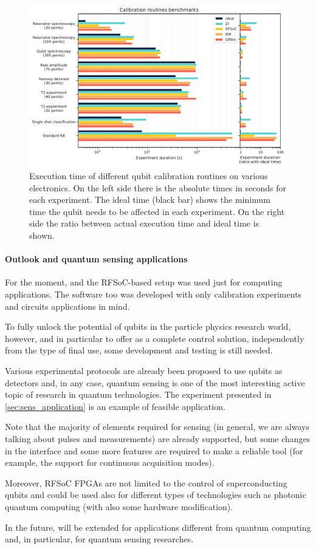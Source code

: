 \begin{figure}[ht]
    \centering
    \includegraphics[width=\textwidth]{Other sections/figures/routines.pdf}
    \caption[Speed benchmark of a \Qibosoq system Vs. commercial alternatives]{Execution time of different qubit calibration routines on various electronics. On the left side there is the absolute times in seconds for each experiment. The ideal time (black bar) shows the minimum time the qubit needs to be affected in each experiment. On the right side the ratio between actual execution time and ideal time is shown.}
    \label{fig:benchmark}
\end{figure}


\paragraph{Outlook and quantum sensing applications}

For the moment, \Qibosoq and the RFSoC-based setup was used just for computing applications.
The software too was developed with only calibration experiments and circuits applications in mind.

To fully unlock the potential of qubits in the particle physics research world, however, and in particular to offer \Qibosoq as a complete control solution, independently from the type of final use, some development and testing is still needed.

Various experimental protocols are already been proposed to use qubits as detectors and, in any case, quantum sensing is one of the most interesting active topic of research in quantum technologies.
The experiment presented in \cref{sec:sens_application} is an example of feasible application.

Note that the majority of elements required for sensing (in general, we are always talking about pulses and measurements) are already supported, but some changes in the interface and some more features are required to make \Qibosoq a reliable tool (for example, the support for continuous acquisition modes).

Moreover, RFSoC FPGAs are not limited to the control of superconducting qubits and could be used also for different types of technologies such as photonic quantum computing (with also some hardware modification).

In the future, \Qibosoq will be extended for applications different from quantum computing and, in particular, for quantum sensing researches.